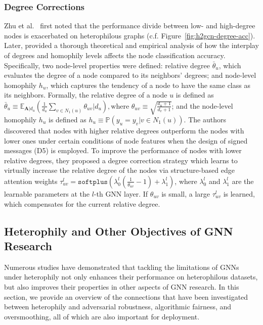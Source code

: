 \subsubsection{Degree Corrections}
Zhu et al.~\cite{zhu2020beyond} first noted that the performance divide between low- and high-degree nodes is exacerbated on heterophilous graphs (c.f. Figure~\ref{fig:h2gcn-degree-acc}). 
Later, \citet{yan2022two} provided a thorough theoretical and empirical analysis of how the interplay of degrees and homophily levels affects the node classification accuracy. Specifically, two node-level properties were defined: relative degree ${\bar{\theta}_u}$, which evaluates the degree of a node compared to its neighbors' degrees; and node-level homophily $h_u$, which captures the tendency of a node to have the same class as its neighbors. 
Formally, the relative degree of a node $u$ is defined as ${\bar{\theta}_u}\equiv\mathbb{E}_{\mathbf{A}|d_u}(\frac{1}{d_u} \sum_{v \in N_1(u)} \theta_{uv}|d_u), \text{where } \theta_{uv}\equiv\sqrt{\frac{d_u + 1}{d_v + 1}}$; and the node-level homophily $h_u$ is defined as $h_u \equiv \mathbb{P}(y_u=y_v|v \in N_1(u)).$ 
The authors discovered that nodes with higher relative degrees outperform the nodes with lower ones under certain conditions of node features when
the design of signed messages (D5) is employed.
To improve the performance of nodes with lower relative degrees, they proposed a degree correction strategy which learns to virtually increase the relative degree of the nodes via structure-based edge attention weights $\tau_{uv}^l = \texttt{softplus}\left (\lambda_0^l\left (\tfrac{1}{\theta_{uv}}-1\right )+\lambda_1^l\right )$, where $\lambda_0^l$ and $\lambda_1^l$ are the learnable parameters at the $l$-th GNN layer. If $\theta_{uv}$ is small, a large $\tau_{uv}^l$ is learned, which compensates for the current relative degree.





\subsection{Heterophily and Other Objectives of GNN Research}
\label{sec:progress-connections}

Numerous studies have demonstrated that tackling the limitations of GNNs under heterophily not only enhances their performance on heterophilous datasets, but also improves their properties in other aspects of GNN research. In this section, we provide an overview of the connections that have been investigated between heterophily and adversarial robustness, algorithmic fairness, and oversmoothing, all of which are also important for deployment. 


